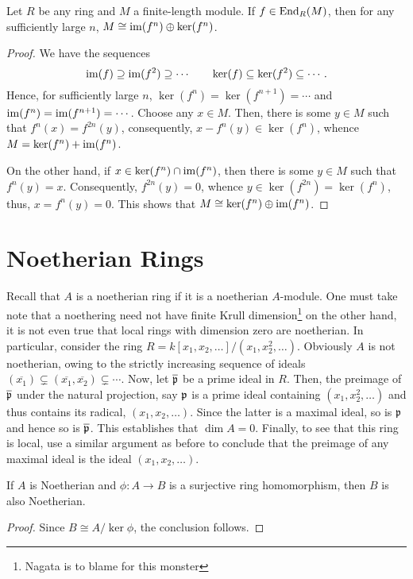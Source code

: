 \begin{lemma}[Fitting]
    Let $R$ be any ring and $M$ a finite-length module. If $f\in\operatorname{End}_R(M)$, then for any sufficiently large $n$, $M\cong\operatorname{im}(f^n)\oplus\ker(f^n)$.
\end{lemma}
\begin{proof}
    We have the sequences 
    \begin{equation*}
        \operatorname{im}(f)\supseteq\operatorname{im}(f^2)\supseteq\cdots\qquad\ker(f)\subseteq\ker(f^2)\subseteq\cdots.
    \end{equation*}
    Hence, for sufficiently large $n$, $\ker(f^n) = \ker(f^{n + 1}) = \cdots$ and $\operatorname{im}(f^n) = \operatorname{im}(f^{n+ 1}) = \cdots$. Choose any $x\in M$. Then, there is some $y\in M$ such that $f^n(x) = f^{2n}(y)$, consequently, $x - f^n(y)\in\ker(f^{n})$, whence $M = \ker(f^n) + \operatorname{im}(f^n)$.

    On the other hand, if $x\in\ker(f^n)\cap\operatorname{im}(f^n)$, then there is some $y\in M$ such that $f^n(y) = x$. Consequently, $f^{2n}(y) = 0$, whence $y\in\ker(f^{2n}) = \ker(f^n)$, thus, $x = f^n(y) = 0$. This shows that $M\cong\ker(f^n)\oplus\operatorname{im}(f^n)$.
\end{proof}

\section{Noetherian Rings}

Recall that $A$ is a noetherian ring if it is a noetherian $A$-module. One must take note that a noethering need not have finite Krull dimension\footnote{Nagata is to blame for this monster} on the other hand, it is not even true that local rings with dimension zero are noetherian. In particular, consider the ring $R = k[x_1,x_2,\ldots]/(x_1,x_2^2,\ldots)$. Obviously $A$ is not noetherian, owing to the strictly increasing sequence of ideals $(\overline{x_1})\subsetneq(\overline{x_1},\overline{x_2})\subsetneq\cdots$. Now, let $\overline{\mathfrak p}$ be a prime ideal in $R$. Then, the preimage of $\overline{\mathfrak p}$ under the natural projection, say $\mathfrak p$ is a prime ideal containing $(x_1,x_2^2,\ldots)$ and thus contains its radical, $(x_1,x_2,\ldots)$. Since the latter is a maximal ideal, so is $\mathfrak p$ and hence so is $\overline{\mathfrak p}$. This establishes that $\dim A = 0$. Finally, to see that this ring is local, use a similar argument as before to conclude that the preimage of any maximal ideal is the ideal $(x_1,x_2,\ldots)$.

\begin{lemma}
    If $A$ is Noetherian and $\phi: A\to B$ is a surjective ring homomorphism, then $B$ is also Noetherian.
\end{lemma}
\begin{proof}
    Since $B\cong A/\ker\phi$, the conclusion follows.
\end{proof}


